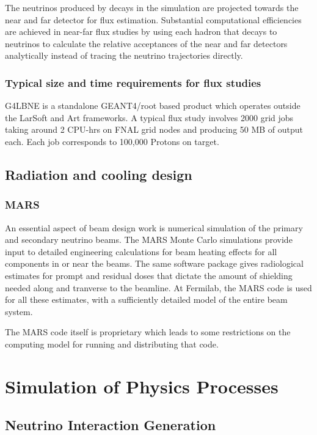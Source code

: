 The neutrinos produced by decays in the simulation are projected towards
the near and far detector for flux estimation. Substantial computational efficiencies are achieved in near-far flux studies by using each hadron that decays to neutrinos to calculate the relative acceptances of the near and far detectors analytically instead of tracing the neutrino trajectories directly\cite{Szleper:2001nj}.


\subsubsection{Typical size and time requirements for flux studies}
G4LBNE is a standalone GEANT4/root based product which operates outside the LarSoft and Art frameworks. 
A typical flux study involves 
2000 grid jobs taking around 2 CPU-hrs on FNAL grid nodes and producing 50 MB of output each.  Each job corresponds to 100,000 Protons on target.    


\subsection{Radiation and cooling design}
\subsubsection{MARS} %

An essential aspect of beam design work is numerical simulation of the primary and secondary neutrino beams. The MARS Monte Carlo  simulations provide input to detailed engineering calculations for beam heating effects for all components in or near the beams. The same software package gives radiological estimates for prompt and residual doses that dictate the amount of shielding needed along and tranverse to the beamline. At Fermilab, the MARS code \cite{abs_1} is used for all these estimates, with a sufficiently detailed model of the entire beam system.  

The MARS code itself is proprietary %
which leads to some restrictions on the computing model for running and distributing that code. 

\section{Simulation of Physics Processes}
\subsection{Neutrino Interaction Generation}
